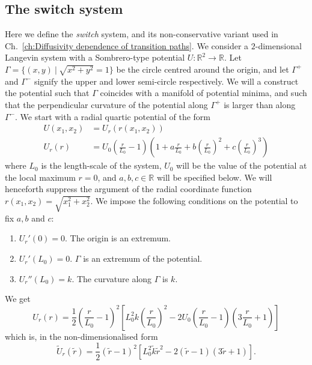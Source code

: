 \documentclass[withindex,glossary,techreport]{cam-thesis}
\begin{document}
\begin{appendices}
\section{The switch system} \label{app:The switch system}

Here we define the \textit{switch} system, and its non-conservative variant used in Ch.~\ref{ch:Diffusivity dependence of transition paths}. We consider a $2$-dimensional Langevin system with a Sombrero-type potential $U : \mathbb{R}^2 \to \mathbb{R}$. Let $\Gamma=\{(x,y)\ |\ \sqrt{x^2 + y^2} =1\}$ be the circle centred around the origin, and let $\Gamma^{+}$ and
$\Gamma^{-}$ signify the upper and lower semi-circle respectively. We will a construct the potential such that $\Gamma$ coincides with a manifold of potential minima, and such that the perpendicular curvature of the potential along $\Gamma^{+}$ is larger than along $\Gamma^{-}$. We
start with a radial quartic potential of the form 
\begin{align}
U(x_{1},x_{2}) & =U_{r}(r(x_{1},x_{2}))\\
U_{r}(r) & =U_{0}\left(\frac{r}{L_0}-1\right)\left(1+a\frac{r}{L_0}+b\left(\frac{r}{L_0}\right)^{2}+c\left(\frac{r}{L_0}\right)^{3}\right)\nonumber 
\end{align}
where $L_0$ is the length-scale of the system, $U_{0}$ will be the
value of the potential at the local maximum $r=0$, and $a,b,c\in\mathbb{R}$
will be specified below. We will henceforth suppress the argument of
the radial coordinate function $r(x_{1},x_{2})=\sqrt{x_{1}^{2}+x_{2}^{2}}$. We
impose the following conditions on the potential to fix $a, b$ and $c$:
\begin{enumerate}
\item $U_r'(0) = 0$. The origin is an extremum.
\item $U_r'(L_0) = 0$. $\Gamma$ is an extremum of the potential.
\item $U_r''(L_0) = k$. The curvature along $\Gamma$ is $k$.
\end{enumerate}
We get
\begin{equation}
U_{r}(r)=\frac{1}{2}\left(\frac{r}{L_0}-1\right)^{2}\left[L_0^{2} k \left(\frac{r}{L_0}\right)^{2}-2U_{0}\left(\frac{r}{L_0}-1\right)\left(3\frac{r}{L_0}+1\right)\right]
\end{equation}
which is, in the non-dimensionalised form
\begin{equation}
\tilde{U}_{r}(\tilde{r})= \frac{1}{2} 
\left( \tilde{r} -1 \right)^{2} \left[L_0^{2} \tilde{k} \tilde{r}^{2}-2  
\left(\tilde{r}-1\right)\left(3\tilde{r}+1\right)\right].

\end{equation}
\end{appendices}
\end{document}

